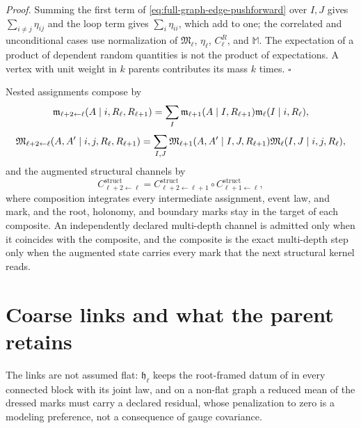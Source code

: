 \noindent\emph{Proof.}
Summing the first term of \eqref{eq:full-graph-edge-pushforward} over $I,J$ gives
$\sum_{i\ne j}\eta_{ij}$ and the loop term gives $\sum_i\eta_{ii}$, which add to one;
the correlated and unconditional cases use normalization of $\mathfrak M_\ell$,
$\eta_\ell$, $C^R_\ell$, and $\mathbb M$. The expectation of a product of dependent
random quantities is not the product of expectations. A vertex with unit weight in $k$
parents contributes its mass $k$ times. $\square$

Nested assignments compose by
\begin{equation}
\mathfrak m_{\ell+2\leftarrow\ell}(A\mid i,R_\ell,R_{\ell+1})
=\sum_I\mathfrak m_{\ell+1}(A\mid I,R_{\ell+1})\mathfrak m_\ell(I\mid i,R_\ell),
\label{eq:full-graph-membership-composition}
\end{equation}
\begin{equation}
\mathfrak M_{\ell+2\leftarrow\ell}(A,A'\mid i,j,R_\ell,R_{\ell+1})
=\sum_{I,J}\mathfrak M_{\ell+1}(A,A'\mid I,J,R_{\ell+1})\mathfrak M_\ell(I,J\mid i,j,R_\ell),
\label{eq:full-graph-joint-membership-composition}
\end{equation}
and the augmented structural channels by
\begin{equation}
C^{\mathrm{struct}}_{\ell+2\leftarrow\ell}
=C^{\mathrm{struct}}_{\ell+2\leftarrow\ell+1}\circ C^{\mathrm{struct}}_{\ell+1\leftarrow\ell},
\label{eq:full-graph-structural-channel-composition}
\end{equation}
where composition integrates every intermediate assignment, event law, and mark, and
the root, holonomy, and boundary marks stay in the target of each composite. An
independently declared multi-depth channel is admitted only when it coincides with the
composite, and the composite is the exact multi-depth step only when the augmented
state carries every mark that the next structural kernel reads.

\section{Coarse links and what the parent retains}
\label{sec:full-graph-vfe-nonflat}

The links are not assumed flat: $\mathfrak h_\ell$ keeps the root-framed datum of
 in every connected block with its joint law, and on a
non-flat graph a reduced mean of the dressed marks must carry a declared residual,
whose penalization to zero is a modeling preference, not a consequence of gauge
covariance.


